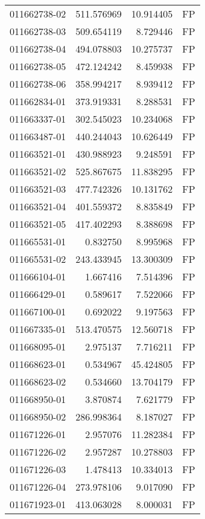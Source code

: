 \begin{tabular}{lrrl}
011662738-02 &  511.576969 &    10.914405 &   FP \\
011662738-03 &  509.654119 &     8.729446 &   FP \\
011662738-04 &  494.078803 &    10.275737 &   FP \\
011662738-05 &  472.124242 &     8.459938 &   FP \\
011662738-06 &  358.994217 &     8.939412 &   FP \\
011662834-01 &  373.919331 &     8.288531 &   FP \\
011663337-01 &  302.545023 &    10.234068 &   FP \\
011663487-01 &  440.244043 &    10.626449 &   FP \\
011663521-01 &  430.988923 &     9.248591 &   FP \\
011663521-02 &  525.867675 &    11.838295 &   FP \\
011663521-03 &  477.742326 &    10.131762 &   FP \\
011663521-04 &  401.559372 &     8.835849 &   FP \\
011663521-05 &  417.402293 &     8.388698 &   FP \\
011665531-01 &    0.832750 &     8.995968 &   FP \\
011665531-02 &  243.433945 &    13.300309 &   FP \\
011666104-01 &    1.667416 &     7.514396 &   FP \\
011666429-01 &    0.589617 &     7.522066 &   FP \\
011667100-01 &    0.692022 &     9.197563 &   FP \\
011667335-01 &  513.470575 &    12.560718 &   FP \\
011668095-01 &    2.975137 &     7.716211 &   FP \\
011668623-01 &    0.534967 &    45.424805 &   FP \\
011668623-02 &    0.534660 &    13.704179 &   FP \\
011668950-01 &    3.870874 &     7.621779 &   FP \\
011668950-02 &  286.998364 &     8.187027 &   FP \\
011671226-01 &    2.957076 &    11.282384 &   FP \\
011671226-02 &    2.957287 &    10.278803 &   FP \\
011671226-03 &    1.478413 &    10.334013 &   FP \\
011671226-04 &  273.978106 &     9.017090 &   FP \\
011671923-01 &  413.063028 &     8.000031 &   FP \\

\end{tabular}
